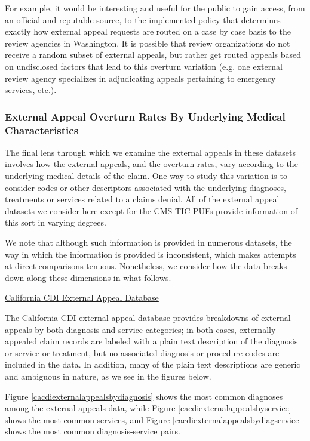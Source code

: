\documentclass[12pt, a4paper,twoside,parskip=full]{report}
\theoremstyle{plain} %
\theoremstyle{definition} %
\theoremstyle{remark} %
\numberwithin{equation}{chapter}
\begin{document}
		For example, it would be interesting and useful for the public to gain access, from an official and reputable source, to the implemented policy that determines exactly how external appeal requests are routed on a case by case basis to the review agencies in Washington. It is possible that review organizations do not receive a random subset of external appeals, but rather get routed appeals based on undisclosed factors that lead to this overturn variation (e.g. one external review agency specializes in adjudicating appeals pertaining to emergency services, etc.).
		
		\subsubsection{External Appeal Overturn Rates By Underlying Medical Characteristics}
		
		The final lens through which we examine the external appeals in these datasets involves how the external appeals, and the overturn rates, vary according to the underlying medical details of the claim. One way to study this variation is to consider codes or other descriptors associated with the underlying diagnoses, treatments or services related to a claims denial. All of the external appeal datasets we consider here except for the CMS TIC PUFs provide information of this sort in varying degrees.
		
		We note that although such information is provided in numerous datasets, the way in which the information is provided is inconsistent, which makes attempts at direct comparisons tenuous. Nonetheless, we consider how the data breaks down along these dimensions in what follows.
		
		\underline{California CDI External Appeal Database}
		
		The California CDI external appeal database provides breakdowns of external appeals by both diagnosis and service categories; in both cases, externally appealed claim records are labeled with a plain text description of the diagnosis or service or treatment, but no associated diagnosis or procedure codes are included in the data. In addition, many of the plain text descriptions are generic and ambiguous in nature, as we see in the figures below.
		
		Figure \ref{cacdiexternalappealsbydiagnosis} shows the most common diagnoses among the external appeals data, while Figure \ref{cacdiexternalappealsbyservice} shows the most common services, and Figure \ref{cacdiexternalappealsbydiagservice} shows the most common diagnosis-service pairs.
		
\end{document}
